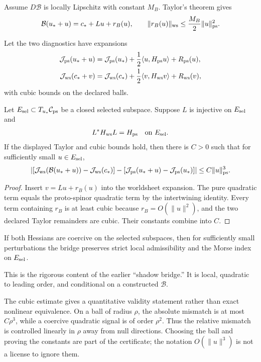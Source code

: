 \documentclass[11pt]{article}
\begin{document}
Assume $D\mathcal B$ is locally Lipschitz with constant $M_B$.  Taylor's
theorem gives
\[
 \mathcal B(u_\ast+u)
 =c_\ast+Lu+r_B(u),
 \qquad
 \|r_B(u)\|_{\rm ws}\le\frac{M_B}{2}\|u\|_{\rm ps}^2.
\]

Let the two diagnostics have expansions
\begin{align*}
 \mathcal J_{\rm ps}(u_\ast+u)
 &=\mathcal J_{\rm ps}(u_\ast)
 +\frac12\langle u,H_{\rm ps}u\rangle+R_{\rm ps}(u),\\
 \mathcal J_{\rm ws}(c_\ast+v)
 &=\mathcal J_{\rm ws}(c_\ast)
 +\frac12\langle v,H_{\rm ws}v\rangle+R_{\rm ws}(v),
\end{align*}
with cubic bounds on the declared balls.

\begin{theorem}
Let $E_{\rm sel}\subset T_{u_\ast}\mathcal C_{\rm ps}$ be a closed selected
subspace.  Suppose $L$ is injective on $E_{\rm sel}$ and
\[
 L^*H_{\rm ws}L=H_{\rm ps}\quad\text{on }E_{\rm sel}.
\]
If the displayed Taylor and cubic bounds hold, then there is $C>0$ such that
for sufficiently small $u\in E_{\rm sel}$,
\[
 \left|
 [\mathcal J_{\rm ws}(\mathcal B(u_\ast+u))-\mathcal J_{\rm ws}(c_\ast)]
 -[\mathcal J_{\rm ps}(u_\ast+u)-\mathcal J_{\rm ps}(u_\ast)]
 \right|
 \le C\|u\|_{\rm ps}^3.
\]
\end{theorem}

\begin{proof}
Insert $v=Lu+r_B(u)$ into the worldsheet expansion.  The pure quadratic term
equals the proto-spinor quadratic term by the intertwining identity.  Every
term containing $r_B$ is at least cubic because $r_B=O(\|u\|^2)$, and the two
declared Taylor remainders are cubic.  Their constants combine into $C$.
\end{proof}

\begin{corollary}
If both Hessians are coercive on the selected subspaces, then for sufficiently
small perturbations the bridge preserves strict local admissibility and the
Morse index on $E_{\rm sel}$.
\end{corollary}

This is the rigorous content of the earlier ``shadow bridge.''  It is local,
quadratic to leading order, and conditional on a constructed $\mathcal B$.

The cubic estimate gives a quantitative validity statement rather than exact
nonlinear equivalence.  On a ball of radius $\rho$, the absolute mismatch is
at most $C\rho^3$, while a coercive quadratic signal is of order $\rho^2$.
Thus the relative mismatch is controlled linearly in $\rho$ away from null
directions.  Choosing the ball and proving the constants are part of the
certificate; the notation $O(\|u\|^3)$ is not a license to ignore them.
\end{document}
